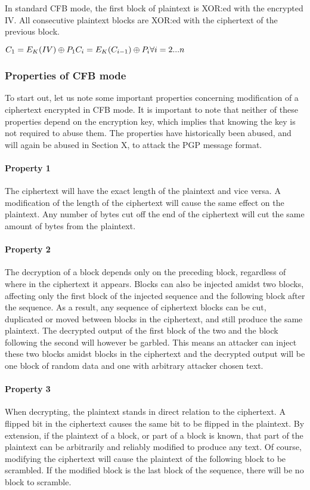\documentclass[runningheads,a4paper]{llncs}[2018/03/10]
\begin{document}
In standard CFB mode, the first block of plaintext is XOR:ed with the encrypted 
IV. All consecutive plaintext blocks are XOR:ed with the ciphertext of the 
previous block.

$
\\
C_1 = E_K(IV) \oplus P_1 \\
C_i = E_K(C_{i-1}) \oplus P_i \forall i = 2 ... n
$


\subsubsection{Properties of CFB mode}

To start out, let us note some important properties concerning modification of a 
ciphertext encrypted in CFB mode. It is important to note that neither of these 
properties depend on the encryption key, which implies that knowing the key is 
not required to abuse them. The properties have historically been abused, and 
will again be abused in Section X, to attack the PGP message format.



\paragraph{Property 1} The ciphertext will have the exact length of
the plaintext and vice versa. A modification of the length of the
ciphertext will cause the same effect on the plaintext. Any number of
bytes cut off the end of the ciphertext will cut the same amount of
bytes from the plaintext.
 
\paragraph{Property 2} The decryption of a block depends only on the
preceding block, regardless of where in the ciphertext it
appears. Blocks can also be injected amidst two blocks, affecting only
the first block of the injected sequence and the following block after the sequence. As a result, any
sequence of ciphertext blocks can be cut, duplicated or moved between
blocks in the ciphertext, and still produce the same plaintext. The
decrypted output of the first block of the two and the block following
the second will however be garbled. This means an attacker can inject
these two blocks amidst blocks in the ciphertext and the decrypted
output will be one block of random data and one with arbitrary
attacker chosen text.


\paragraph{Property 3} When decrypting, the plaintext stands in direct
relation to the ciphertext. A flipped bit in the ciphertext causes the
same bit to be flipped in the plaintext. By extension, if the
plaintext of a block, or part of a block is known, that part of the
plaintext can be arbitrarily and reliably modified to produce any
text. Of course, modifying the ciphertext will cause the plaintext of
the following block to be scrambled. If the modified block is the last
block of the sequence, there will be no block to scramble.
\end{document}
